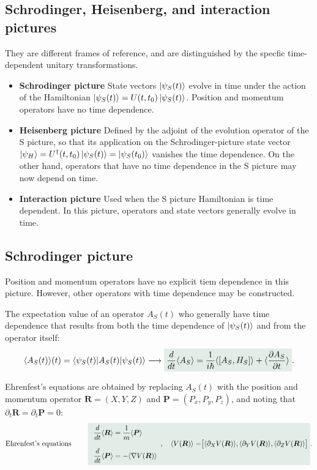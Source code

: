 \subsection{Schrodinger, Heisenberg, and interaction pictures}
They are different frames of reference, and are distinguished by the specfic time-dependent unitary transformations.
\begin{itemize}[itemsep=0pt,topsep=0pt]
    \item\textbf{Schrodinger picture} State vectors $\left|\psi_S(t)\right\rangle$ evolve in time under the action of the Hamiltonian $\left|\psi_S(t)\right\rangle=U(t,t_0)\left|\psi_S(t)\right\rangle$. Position and momentum operators have no time dependence.
    \item\textbf{Heisenberg picture} Defined by the adjoint of the evolution operator of the S picture, so that its application on the Schrodinger-picture state vector $\left|\psi_H\right\rangle=U^\dagger(t,t_0)\left|\psi_S(t)\right\rangle=\left|\psi_S(t_0)\right\rangle$ 
    vanishes the time dependence. On the other hand, operators that have no time dependence in the S picture may now depend on time.
    \item\textbf{Interaction picture} Used when the S picture Hamiltonian is time dependent. In this picture, operators and state vectors generally evolve in time.
\end{itemize}
\subsection{Schrodinger picture}
Position and momentum operators have no explicit tiem dependence in this picture. However, other operators with time dependence may be constructed.

The expectation value of an operator $A_S(t)$ who generally have time dependence that results from both the time dependence of $\left|\psi_S(t)\right\rangle$ and from the operator itself:
\begin{align}
    \braket{A_S(t)}(t)=\braket{\psi_S(t)|A_S(t)|\psi_S(t)}\longrightarrow\highlight{\frac{d}{dt}\braket{A_S}=\frac{1}{i\hbar}\braket{[A_S,H_S]}+\braket{\frac{\partial A_S}{\partial t}}}.
\end{align}

Ehrenfest's equations are obtained by replacing $A_S(t)$ with the position and momentum operator $\bm{R}=(X,Y,Z)$ and $\bm{P}=(P_x,P_y,P_z)$, and noting that $\partial_t\bm{R}=\partial_t\bm{P}=0$:
\begin{align}
    \text{Ehrenfest's equations }\qquad\highlight{\begin{array}{l}
        \dfrac{d}{dt}\braket{\bm{R}}=\dfrac{1}{m}\braket{\bm{P}}\\\\
        \dfrac{d}{dt}\braket{\bm{P}}=-\braket{\nabla V(\bm{R})}
    \end{array},\quad\braket{V(\bm{R})}=\bigr[\braket{\partial_XV(\bm{R})},\braket{\partial_YV(\bm{R})},\braket{\partial_ZV(\bm{R})}\bigr]}.
\end{align}
